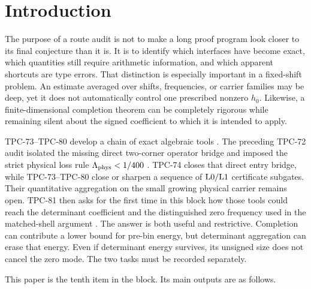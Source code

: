 \section{Introduction}
\label{sec:introduction}

The purpose of a route audit is not to make a long proof program look
closer to its final conjecture than it is.  It is to identify which
interfaces have become exact, which quantities still require
arithmetic information, and which apparent shortcuts are type errors.
That distinction is especially important in a fixed-shift problem.
An estimate averaged over shifts, frequencies, or carrier families
may be deep, yet it does not automatically control one prescribed
nonzero \(h_0\).  Likewise, a finite-dimensional completion theorem can
be completely rigorous while remaining silent about the signed
coefficient to which it is intended to apply.

TPC-73--TPC-80 develop a chain of exact algebraic tools
\citep{WangTPC73,WangTPC74,WangTPC75,WangTPC76,WangTPC77,WangTPC78,WangTPC79,WangTPC80}.
The preceding TPC-72 audit isolated the missing direct two-corner
operator bridge and imposed the strict physical loss rule
\(\Lambda_{\rm phys}<1/400\) \citep{WangTPC72}.  TPC-74 closes that
direct entry bridge, while TPC-73--TPC-80 close or sharpen a sequence
of \(\mathrm{L0}/\mathrm{L1}\) certificate subgates.  Their quantitative
aggregation on the small growing physical carrier remains open.
TPC-81 then asks for the first time in this block how those tools could
reach the determinant coefficient and the distinguished zero
frequency used in the matched-shell argument
\citep{WangTPC81,WangTPC32,WangTPC33}.  The answer is both useful and
restrictive.  Completion can contribute a lower bound for pre-bin
energy, but determinant aggregation can erase that energy.  Even if
determinant energy survives, its unsigned size does not cancel the
zero mode.  The two tasks must be recorded separately.

This paper is the tenth item in the block.  Its main outputs are as
follows.

